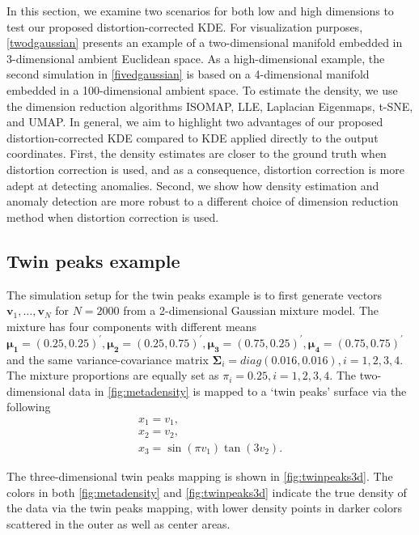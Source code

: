 \documentclass[11pt,a4paper,]{article}
\begin{document}
In this section, we examine two scenarios for both low and high dimensions to test our proposed distortion-corrected KDE. For visualization purposes, \autoref{twodgaussian} presents an example of a two-dimensional manifold embedded in 3-dimensional ambient Euclidean space. As a high-dimensional example, the second simulation in \autoref{fivedgaussian} is based on a 4-dimensional manifold embedded in a 100-dimensional ambient space. To estimate the density, we use the dimension reduction algorithms ISOMAP, LLE, Laplacian Eigenmaps, t-SNE, and UMAP. In general, we aim to highlight two advantages of our proposed distortion-corrected KDE compared to KDE applied directly to the output coordinates. First, the density estimates are closer to the ground truth when distortion correction is used, and as a consequence, distortion correction is more adept at detecting anomalies. Second, we show how density estimation and anomaly detection are more robust to a different choice of dimension reduction method when distortion correction is used.

\hypertarget{twodgaussian}{%
\subsection{Twin peaks example}\label{twodgaussian}}

The simulation setup for the twin peaks example is to first generate vectors \(\pmb{v}_1,\dots,\pmb{v}_N\) for \(N=2000\) from a 2-dimensional Gaussian mixture model. The mixture has four components with different means
\(\pmb{\mu_1}=(0.25, 0.25)^\prime, \pmb{\mu_2}=(0.25, 0.75)^\prime, \pmb{\mu_3}=(0.75, 0.25)^\prime, \pmb{\mu_4}=(0.75, 0.75)^\prime\) and the same variance-covariance matrix \(\pmb{\Sigma}_i=diag(0.016, 0.016), i=1,2,3,4\). The mixture proportions
are equally set as \(\pi_i=0.25, i=1,2,3,4\). The two-dimensional data in \autoref{fig:metadensity} is mapped to a `twin peaks' surface via the following
\begin{equation}
\label{eq:twinpeak}
\begin{array}{lcl}
x_1 = v_1, \\
x_2 = v_2, \\
x_3 = \sin(\pi v_1) \tan (3 v_2).
\end{array}
\end{equation}

The three-dimensional twin peaks mapping is shown in \autoref{fig:twinpeaks3d}. The colors in both \autoref{fig:metadensity} and \autoref{fig:twinpeaks3d} indicate the true density of the data via the twin peaks mapping, with lower density points in darker colors scattered in the outer as well as center areas.
\end{document}
